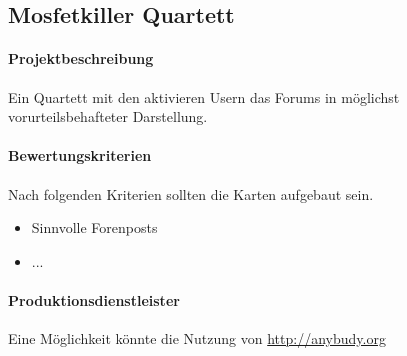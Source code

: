 \subsection{Mosfetkiller Quartett}
\paragraph{Projektbeschreibung} Ein Quartett mit den aktivieren Usern das Forums in möglichst vorurteilsbehafteter Darstellung. 
\paragraph{Bewertungskriterien} Nach folgenden Kriterien sollten die Karten aufgebaut sein.
\begin{itemize}
	\item Sinnvolle Forenposts
	\item ...
\end{itemize}

\paragraph{Produktionsdienstleister} Eine Möglichkeit könnte die Nutzung von \url{http://anybudy.org}